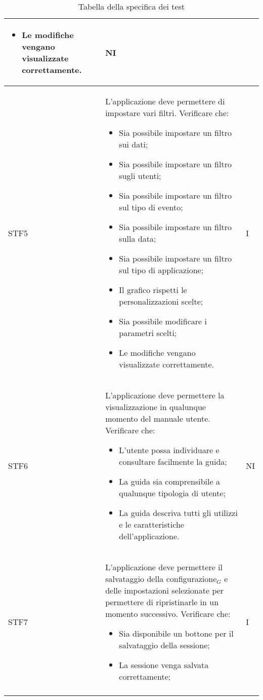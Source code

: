 \begin{center}
\begin{longtable}{|p{1.5cm}|p{11cm}|p{1cm}|}
\begin{itemize}
            \item Le modifiche vengano visualizzate correttamente.
        \end{itemize} & NI\\ \hline
        \rowcolor[HTML]{C0C0C0}
        STF5 & L'applicazione deve permettere di impostare vari filtri. Verificare che: \begin{itemize}
            \item Sia possibile impostare un filtro sui dati;
            \item Sia possibile impostare un filtro sugli utenti;
            \item Sia possibile impostare un filtro sul tipo di evento;
            \item Sia possibile impostare un filtro sulla data;
            \item Sia possibile impostare un filtro sul tipo di applicazione;
            \item Il grafico rispetti le personalizzazioni scelte;
            \item Sia possibile modificare i parametri scelti;
            \item Le modifiche vengano visualizzate correttamente.
        \end{itemize} & I\\ \hline
        \rowcolor[HTML]{EFEFEF}
        STF6 & L'applicazione deve permettere la visualizzazione in qualunque momento del manuale utente. Verificare che: \begin{itemize}
            \item L'utente possa individuare e consultare facilmente la guida;
            \item La guida sia comprensibile a qualunque tipologia di utente;
            \item La guida descriva tutti gli utilizzi e le caratteristiche dell'applicazione.
        \end{itemize} & NI\\ \hline
        \rowcolor[HTML]{C0C0C0}
        STF7 & L'applicazione deve permettere il salvataggio della configurazione$_G$ e delle impostazioni selezionate per permettere di ripristinarle in un momento successivo. Verificare che: \begin{itemize}
            \item Sia disponibile un bottone per il salvataggio della sessione;
            \item La sessione venga salvata correttamente;
        \end{itemize}& I\\ \hline
        \caption{Tabella della specifica dei test}
    \end{longtable}
\end{center}

